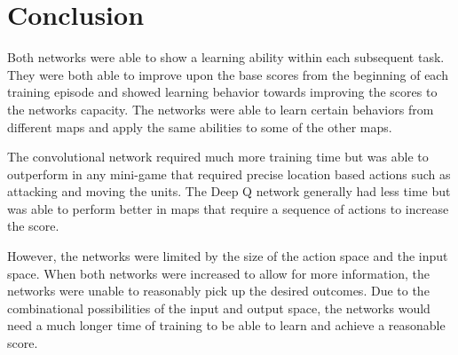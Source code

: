 \section{Conclusion}

Both networks were able to show a learning ability within each subsequent task. They were both able to improve upon the base scores from the beginning of each training episode and showed learning behavior towards improving the scores to the networks capacity. The networks were able to learn certain behaviors from different maps and apply the same abilities to some of the other maps. 

The convolutional network required much more training time but was able to outperform in any mini-game that required precise location based actions such as attacking and moving the units. The Deep Q network generally had less time but was able to perform better in maps that require a sequence of actions to increase the score. 

However, the networks were limited by the size of the action space and the input space. When both networks were increased to allow for more information, the networks were unable to reasonably pick up the desired outcomes. Due to the combinational possibilities of the input and output space, the networks would need a much longer time of training to be able to learn and achieve a reasonable score. 
